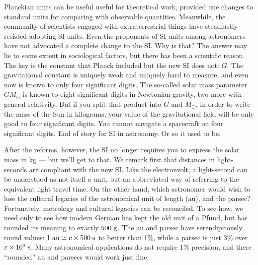 \documentclass[aps,prb,12pt]{revtex4-1}
\def\unit#1{\;{\rm#1}}
\begin{document}
Planckian units can be useful useful for theoretical work, provided
one changes to standard units for comparing with observable
quantities.\cite{magicenv} Meanwhile, the community of scientists
engaged with extraterrestrial things have steadfastly resisted
adopting SI units.  Even the proponents of SI units among astronomers
\cite{dodd2011} have not advocated a complete change to the SI.  Why
is that?  The answer may lie to some extent in sociological factors,
but there has been a scientific reason.  The key is the constant that
Planck included but the new SI does not: $G$.  The gravitational
constant is uniquely weak and uniquely hard to measure, and even now
is known to only four significant digits.\cite{2018Natur.560..562S}
The so-called solar mass parameter $GM_\odot$ is known to eight
significant digits in Newtonian gravity, two more with general
relativity.  But if you split that product into $G$ and $M_\odot$, in
order to write the mass of the Sun in kilograms, your value of the
gravitational field will be only good to four significant digits.  You
cannot navigate a spacecraft on four significant digits.  End of story
for SI in astronomy.  Or so it used to be.

After the reforms, however, the SI no longer requires you to express
the solar mass in kg --- but we'll get to that.  We remark first that
distances in light-seconds are compliant with the new SI.  Like the
electronvolt, a light-second can be understood as not itself a unit,
but an abbreviated way of referring to the equivalent light travel
time.  On the other hand, which astronomer would wish to lose the
cultural legacies of the astronomical unit of length (au), and the
parsec?  Fortunately, metrology and cultural legacies can be
reconciled.  To see how, we need only to see how modern German has
kept the old unit of a Pfund, but has rounded its meaning to exactly
$500\unit{g}$.  The au and parsec have serendipitously round values:
$1\unit{au}\simeq c\times500\unit{s}$ to better than 1\%, while a
parsec is just 3\% over $c\times10^8\unit{s}$.  Many astronomical
applications do not require 1\% precision, and there ``rounded'' au
and parsecs would work just fine.
\end{document}
